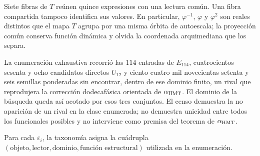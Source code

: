 Siete fibras de \(T\) reúnen quince expresiones con una lectura común. Una
fibra compartida tampoco identifica sus valores. En particular,
\(\varphi^{-1}\), \(\varphi\) y \(\varphi^2\) son reales distintos que el
mapa \(T\) agrupa por una misma órbita de autoescala; la proyección
común conserva función dinámica y olvida la coordenada arquimediana que los
separa.

La enumeración exhaustiva recorrió las \(114\) entradas de \(E_{114}\),
cuatrocientos sesenta y ocho candidatos directos \(U_{12}\) y ciento cuatro
mil novecientas setenta y seis semillas ponderadas sin encontrar, dentro de
ese dominio finito, un rival que reprodujera la corrección dodecafásica
orientada de \(\alpha_{\rm HMT}\). El dominio de la búsqueda queda así
acotado por esos tres conjuntos. El censo demuestra la no aparición de un
rival en la clase enumerada; no demuestra unicidad entre todos los
funcionales posibles y no interviene como premisa del teorema de
\(\alpha_{\rm HMT}\).

Para cada \(\varepsilon_i\), la taxonomía asigna la cuádrupla
\((\text{objeto},\text{lector},\text{dominio},\text{función estructural})\)
utilizada en la enumeración.
